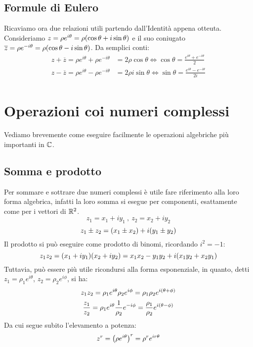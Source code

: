     \subsection{Formule di Eulero}
        Ricaviamo ora due relazioni utili partendo dall'Identit\`a appena otteuta. Consideriamo $z=\rho e^{i\theta}=\rho\qty(\cos\theta+i\sin\theta)$ e il suo coniugato $\overline{z}=\rho e^{-i\theta}=\rho\qty(\cos\theta-i\sin\theta)$.
        Da semplici conti:
        \begin{align*}
            z+\overline{z}=\rho e^{i\theta}+\rho e^{-i\theta}&=2\rho\cos\theta \iff \cos\theta=\frac{e^{i\theta}+e^{-i\theta}}{2}\\
            z-\overline{z}=\rho e^{i\theta}-\rho e^{-i\theta}&=2\rho i\sin\theta \iff \sin\theta=\frac{e^{i\theta}-e^{-i\theta}}{2i}\\
        \end{align*}
\section{Operazioni coi numeri complessi}
Vediamo brevemente come eseguire facilmente le operazioni algebriche pi\`u importanti in $\mathbb{C}$.
    \subsection{Somma e prodotto}
        Per sommare e sottrare due numeri complessi \`e utile fare riferimento alla loro forma algebrica, infatti la loro somma si esegue per componenti, esattamente come per i vettori di $\mathbb{R}^2$. $$z_1=x_1+iy_1\ ,\ z_2=x_2+iy_2$$ $$z_1\pm z_2=\qty(x_1\pm x_2)+i\qty(y_1\pm y_2)$$ Il prodotto si pu\`o eseguire come prodotto di binomi, ricordando $i^2=-1$: $$z_1z_2=\qty(x_1+iy_1)\qty(x_2+iy_2)=x_1x_2-y_1y_2+i\qty(x_1y_2+x_2y_1)$$
        Tuttavia, pu\`o essere pi\`u utile ricondursi alla forma esponenziale, in quanto, detti $z_1=\rho_1e^{i\theta}$, $z_2=\rho_2e^{i\phi}$, si ha: $$z_1z_2=\rho_1e^{i\theta}\rho_2e^{i\phi}=\rho_1\rho_2e^{i\qty(\theta+\phi)}$$ $$\frac{z_1}{z_2}=\rho_1e^{i\theta}\frac{1}{\rho_2}e^{-i\phi}=\frac{\rho_1}{\rho_2}e^{i\qty(\theta-\phi)}$$ Da cui segue subito l'elevamento a potenza: $$z^r=\qty(\rho e^{i\theta})^r=\rho^re^{ir\theta}$$
